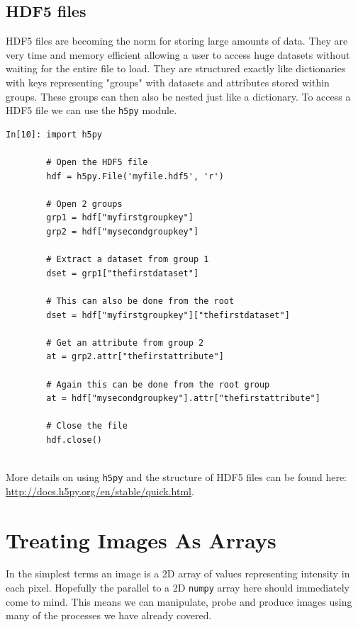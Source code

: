 \begin{tcolorbox}[colback=red!5!white,colframe=red!75!black]
\subsection{HDF5 files}

HDF5 files are becoming the norm for storing large amounts of data. They are very time and memory efficient allowing a user to access huge datasets without waiting for the entire file to load. They are structured exactly like dictionaries with keys representing "groups"  with datasets and attributes stored within groups. These groups can then also be nested just like a dictionary. To access a HDF5 file we can use the \texttt{h5py} module.

\begin{lstlisting}[style=PY]
In[10]: import h5py
        
        # Open the HDF5 file
        hdf = h5py.File('myfile.hdf5', 'r')
        
        # Open 2 groups
        grp1 = hdf["myfirstgroupkey"]
        grp2 = hdf["mysecondgroupkey"]
        
        # Extract a dataset from group 1
        dset = grp1["thefirstdataset"]
        
        # This can also be done from the root
        dset = hdf["myfirstgroupkey"]["thefirstdataset"]
        
        # Get an attribute from group 2
        at = grp2.attr["thefirstattribute"]
        
        # Again this can be done from the root group
        at = hdf["mysecondgroupkey"].attr["thefirstattribute"]
        
        # Close the file
        hdf.close()
            
\end{lstlisting}

More details on using \texttt{h5py} and the structure of HDF5 files can be found here: \url{http://docs.h5py.org/en/stable/quick.html}.

\end{tcolorbox}

\newpage

\section{Treating Images As Arrays}

In the simplest terms an image is a 2D array of values representing intensity in each pixel. Hopefully the parallel to a 2D \texttt{numpy} array here should immediately come to mind. This means we can manipulate, probe and produce images using many of the processes we have already covered. 

